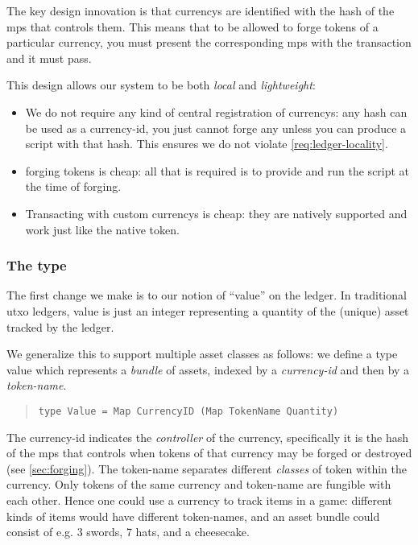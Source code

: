 The key design innovation is that \glspl{currency} are identified with the hash of the \gls{mps} that controls them.
This means that to be allowed to forge \glspl{token} of a particular \gls{currency}, you must present the corresponding \gls{mps} with the transaction and it must pass.

This design allows our system to be both \emph{local} and \emph{lightweight}:
\begin{itemize}
\item
  We do not require any kind of central registration of \glspl{currency}: any hash can be used as a \gls{currency-id}, you just cannot forge any unless you can produce a \gls{script} with that hash.
  This ensures we do not violate \cref{req:ledger-locality}.
\item
  \Gls{forging} \glspl{token} is cheap: all that is required is to provide and run the script at the time of forging.
\item
  Transacting with custom \glspl{currency} is cheap: they are natively supported and work just like the native token.
\end{itemize}


\subsubsection{The  type}
\label{sec:value}
The first change we make is to our notion of ``value'' on the ledger.
In traditional \gls{utxo} ledgers, value is just an integer representing a quantity of the (unique) asset tracked by the ledger.

We generalize this to support multiple asset classes as follows: we define a type \gls{value} which represents a \emph{bundle} of assets, indexed by a \emph{\gls{currency-id}} and then by a \emph{\gls{token-name}}.

\begin{quote}
\begin{verbatim}
type Value = Map CurrencyID (Map TokenName Quantity)
\end{verbatim}
\end{quote}

The \gls{currency-id} indicates the \emph{controller} of the currency, specifically it is the hash of the \gls{mps} that controls when tokens of that currency may be forged or destroyed (see \cref{sec:forging}).
The \gls{token-name} separates different \emph{classes} of \gls{token} within the currency. Only \glspl{token} of the same currency and \gls{token-name} are \gls{fungible} with each other.
Hence one could use a currency to track items in a game: different kinds of items would have different \glspl{token-name}, and an asset bundle could consist of e.g. 3 swords, 7 hats, and a cheesecake.

